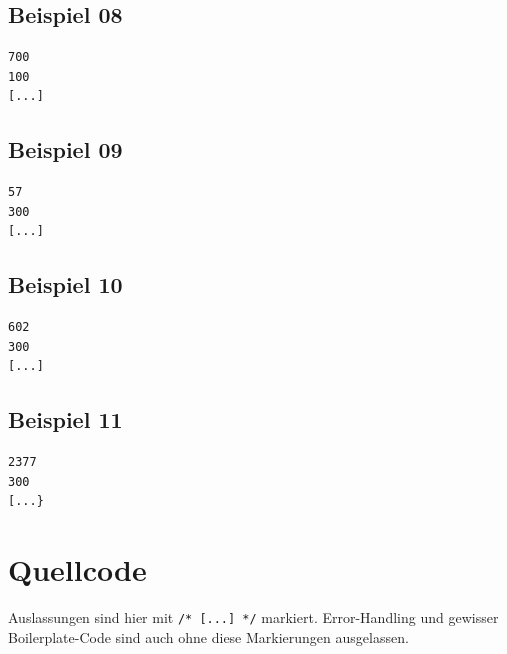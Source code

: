 \documentclass[a4paper,10pt,ngerman]{scrartcl}
\begin{document}
    \subsection{Beispiel 08}
    \begin{lstlisting}[style=plain]
700
100
[...]
    \end{lstlisting}

    \subsection{Beispiel 09}
    \begin{lstlisting}[style=plain]
57
300
[...]
    \end{lstlisting}

    \subsection{Beispiel 10}
    \begin{lstlisting}[style=plain]
602
300
[...]
    \end{lstlisting}

    \subsection{Beispiel 11}
    \begin{lstlisting}[style=plain]
2377
300
[...}
    \end{lstlisting}

    \section{Quellcode}

    Auslassungen sind hier mit \texttt{/* [...] */} markiert. Error-Handling und gewisser Boilerplate-Code sind auch
    ohne diese Markierungen ausgelassen.
\end{document}

